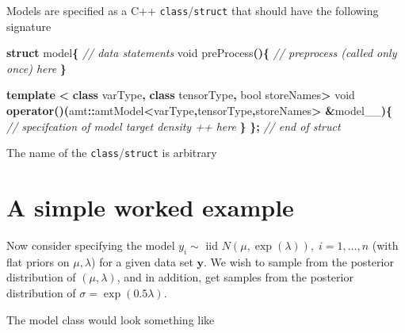 \documentclass[
]{book}
\newenvironment{Shaded}{\begin{snugshade}}{\end{snugshade}}
\newcommand{\CommentTok}[1]{\textcolor[rgb]{0.56,0.35,0.01}{\textit{#1}}}
\newcommand{\DataTypeTok}[1]{\textcolor[rgb]{0.13,0.29,0.53}{#1}}
\newcommand{\KeywordTok}[1]{\textcolor[rgb]{0.13,0.29,0.53}{\textbf{#1}}}
\newcommand{\NormalTok}[1]{#1}
\newcommand{\OperatorTok}[1]{\textcolor[rgb]{0.81,0.36,0.00}{\textbf{#1}}}
\begin{document}
Models are specified as a C++ \texttt{class}/\texttt{struct} that should have the following
signature

\begin{Shaded}
\begin{Highlighting}[]
\KeywordTok{struct}\NormalTok{ model}\OperatorTok{\{}
  \CommentTok{// data statements}
  \DataTypeTok{void}\NormalTok{ preProcess}\OperatorTok{()\{}
    \CommentTok{// preprocess (called only once) here}
  \OperatorTok{\}} 

  \KeywordTok{template} \OperatorTok{\textless{}} \KeywordTok{class}\NormalTok{ varType}\OperatorTok{,} \KeywordTok{class}\NormalTok{ tensorType}\OperatorTok{,} \DataTypeTok{bool}\NormalTok{ storeNames}\OperatorTok{\textgreater{}}
  \DataTypeTok{void} \KeywordTok{operator}\OperatorTok{()(}\NormalTok{amt}\OperatorTok{::}\NormalTok{amtModel}\OperatorTok{\textless{}}\NormalTok{varType}\OperatorTok{,}\NormalTok{tensorType}\OperatorTok{,}\NormalTok{storeNames}\OperatorTok{\textgreater{}} \OperatorTok{\&}\NormalTok{model\_\_}\OperatorTok{)\{}
    \CommentTok{// specifcation of model target density ++ here}
  \OperatorTok{\}} 
\OperatorTok{\};} \CommentTok{// end of struct}
\end{Highlighting}
\end{Shaded}

The name of the \texttt{class}/\texttt{struct} is arbitrary

\hypertarget{simple-worked-example}{%
\section{A simple worked example}\label{simple-worked-example}}

Now consider specifying the model \(y_i \sim\) iid \(N(\mu,\exp(\lambda)),\;i=1,\dots,n\) (with
flat priors on \(\mu,\lambda\)) for a given data set \(\mathbf y\). We wish to sample from the posterior distribution of \((\mu,\lambda)\), and in addition, get samples from the posterior distribution of \(\sigma=\exp(0.5\lambda)\).

The model class would look something like
\end{document}
